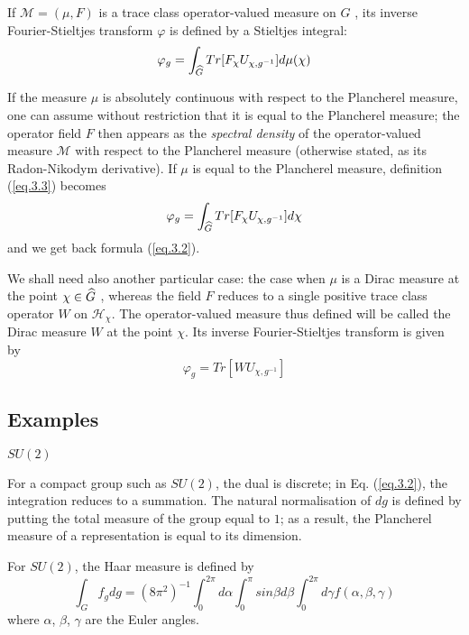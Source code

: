 \documentclass[a4paper,11pt]{article}
\def\Ucgm{U_{\chi,g^{-1}}}
\begin{document}
If $\mathcal{M} = (\mu,F) $ is a trace class operator-valued measure on $G$ , its inverse 
Fourier-Stieltjes transform $\varphi$ is defined by a Stieltjes integral:
\begin{equation}
 \label{eq.3.3}
 \varphi_g = \int_{\Gc} Tr[F_{\chi} \Ucgm] d\mu(\chi)
\end{equation}

If the measure $\mu$ is absolutely continuous with respect to the Plancherel measure, one can 
assume without restriction that it is equal to the Plancherel measure; the operator field $F$
then appears as the {\it spectral density} of the operator-valued measure $\mathcal{M}$ with 
respect to the 
Plancherel measure (otherwise stated, as its Radon-Nikodym derivative). If $\mu$ is equal to 
the Plancherel measure, definition (\ref{eq.3.3}) becomes
\begin{equation}
 \label{eq.3.4}
  \varphi_g = \int_{\Gc} Tr[F_{\chi} \Ucgm] d\chi
\end{equation}
and we get back formula (\ref{eq.3.2}).
 
We shall need also another particular case: the case when $\mu$ is a Dirac measure at the 
point 
$\chi \in  \widehat{G}$ , whereas the field $F$ reduces to a single positive trace class operator $W$ 
on $\mathcal{H}_{\chi}$. The 
operator-valued measure thus defined will be called the Dirac measure $W$ at the point $\chi$. 
Its inverse Fourier-Stieltjes transform is given by
\begin{equation}
 \label{eq.3.5}
 \varphi_g = Tr[W \Ucgm]
\end{equation}

\subsection{Examples}

{\bf  $SU(2)$}

For a compact group such as $SU(2)$, the dual is discrete; in Eq. (\ref{eq.3.2}), the 
integration reduces to 
a summation. The natural normalisation of $dg$ is defined by putting the total measure of the 
group equal to $1$; as a result, the Plancherel measure of a representation is equal to its 
dimension. 

For $SU(2)$, the Haar measure is defined by
$$
\int_G f_g dg = (8 \pi^2)^{-1} \int_0^{2 \pi} d\alpha \int_0^{\pi} sin \beta d\beta \int_0^{2 \pi} d\gamma f(\alpha,\beta,\gamma)
$$
where $\alpha$, $\beta$, $\gamma$ are the Euler angles.
\end{document}
